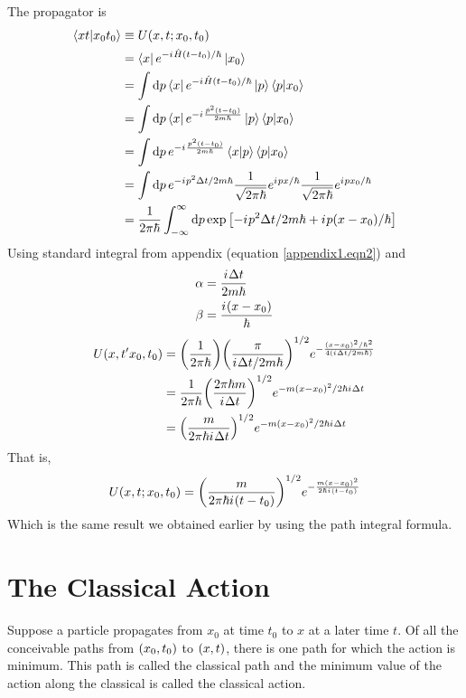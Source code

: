 	
	The propagator is 
	\begin{align}
		\braket{x t}{x_0 t_0} &\equiv U\qty(x, t; x_0, t_0) \\
		&= \bra{x} e^{-{i\mkern1mu} \hat{H}(t-t_0)/\hbar}\ket{x_0} \\
		&= \int \dd{p} \bra{x} e^{-{i\mkern1mu} \hat{H}(t-t_0)/\hbar}\ket{p}\braket{p}{x_0} \\
		&= \int \dd{p} \bra{x} e^{-{i\mkern1mu} \frac{\hat{p}^2\qty(t-t_0)}{2 m \hbar}}\ket{p}\braket{p}{x_0} \\
		&= \int \dd{p} e^{-{i\mkern1mu} \frac{p^2\qty(t-t_0)}{2 m \hbar}}\braket{x}{p}\braket{p}{x_0} \\
		&= \int \dd{p} e^{-{i\mkern1mu} p^2 \Delta t /2 m \hbar} \frac{1}{\sqrt{2\pi\hbar}} e^{{i\mkern1mu} p x/\hbar} \frac{1}{\sqrt{2\pi\hbar}} e^{{i\mkern1mu} p x_0/\hbar} \\
		&= \frac{1}{2\pi\hbar} \int_{-\infty}^{\infty} \dd{p} \exp\qty[-{i\mkern1mu} p^2 \Delta t/2 m \hbar + {i\mkern1mu} p \qty(x-x_0)/\hbar]
	\end{align}
	Using standard integral from appendix (equation \ref{appendix1.eqn2}) and 
	\begin{align}
		\alpha &= \frac{{i\mkern1mu} \Delta t}{2 m \hbar} \\
		\beta &= \frac{{i\mkern1mu} \qty(x-x_0)}{\hbar}
	\end{align}
	\therefore
	\begin{align*}
		U\qty(x,t'x_0,t_0) 
		&= \qty(\frac{1}{2\pi \hbar}) \qty(\frac{\pi}{{i\mkern1mu} \Delta t / 2 m \hbar})^{1/2} e^{-\frac{\qty(x-x_0)^2/\hbar^2}{4\qty({i\mkern1mu} \Delta t /2 m \hbar)}} \\
		&= \frac{1}{2\pi \hbar} \qty(\frac{2\pi \hbar m}{{i\mkern1mu} \Delta t})^{1/2} e^{-m\qty(x-x_0)^2/2 \hbar {i\mkern1mu} \Delta t} \\
		&= \qty(\frac{m}{2\pi \hbar {i\mkern1mu} \Delta t})^{1/2} e^{-m\qty(x-x_0)^2/2 \hbar {i\mkern1mu} \Delta t} 
	\end{align*}
	That is,
	\begin{equation}
		U\qty(x,t;x_0,t_0) = \qty(\frac{m}{2\pi\hbar {i\mkern1mu} \qty(t-t_0)})^{1/2} e^{-\frac{m\qty(x-x_0)^2}{2\hbar {i\mkern1mu} \qty(t-t_0)}}
	\end{equation}
	Which is the same result we obtained earlier by using the path integral formula.
	
	
	\section{The Classical Action}
		Suppose a particle propagates from $x_0$ at time $t_0$ to $x$ at a later time $t$. Of all the conceivable paths from $\qty(x_0, t_0)$ to $\qty(x,t)$, there is one path for which the action is minimum. This path is called the classical path and the minimum value of the action along the classical is called the classical action.
		
